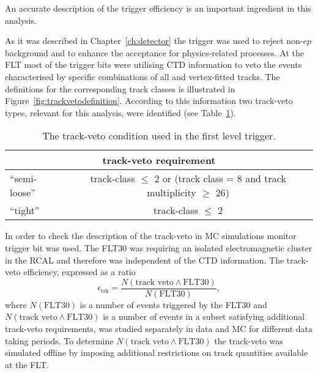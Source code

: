 An accurate description of the trigger efficiency is an important ingredient in this analysis.

As it was described in Chapter~\ref{ch:detector} the \zeus trigger was used to reject non-$ep$ background and to enhance the acceptance for physics-related processes. At the FLT most of the trigger bits were utilising CTD information to veto the events characterised by specific combinations of all and vertex-fitted tracks. The definitions for the corresponding track classes is illustrated in Figure~\ref{fig:trackvetodefinition}. According to this information two track-veto types, relevant for this analysis, were identified (see Table~\ref{tab:trackveto}). 
\begin{table}[htpb]
 \centering
 \begin{tabular}{lc}
 \multicolumn{2}{c}{track-veto requirement} \\
  \hline
 ``semi-loose'' & track-class $\le$ 2 or (track class = 8 and track multiplicity $\ge$ 26) \\
 ``tight''      & track-class $\le$ 2 \\
 \end{tabular} 
\caption{The track-veto condition used in the first level trigger.}
\label{tab:trackveto}
\end{table} 
In order to check the description of the track-veto in MC simulations monitor trigger bit was used. The FLT30 was requiring an isolated electromagnetic cluster in the RCAL and therefore was independent of the CTD information. The track-veto efficiency, expressed as a ratio
\begin{equation}
 \epsilon_\mathrm{trk} = \frac{N\left(\text{track veto} \wedge \text{FLT30}\right)}{N\left(\text{FLT30}\right)},
\end{equation}
where $N\left(\text{FLT30}\right)$ is a number of events triggered by the FLT30 and $N\left(\text{track veto} \wedge \text{FLT30}\right)$ is a number of events in a subset satisfying additional track-veto requirements, was studied separately in data and MC for different data taking periods. To determine $N\left(\text{track veto} \wedge \text{FLT30}\right)$ the track-veto was simulated offline by imposing additional restrictions on track quantities available at the FLT.

